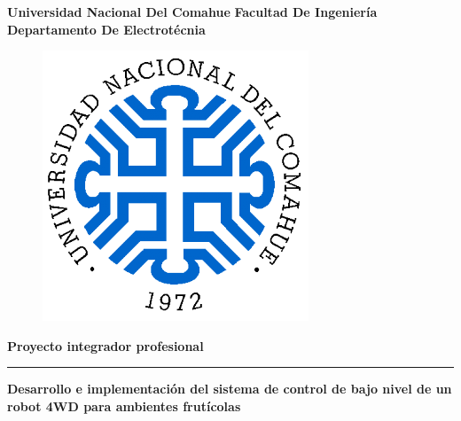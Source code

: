 \begin{titlepage}
    \begin{center}
        {\LARGE \textbf{Universidad Nacional Del Comahue}} 
        \vspace{4mm}
        {\LARGE \textbf{Facultad De Ingeniería}}
        {\LARGE \textbf{Departamento De Electrotécnia}}\\ %
        \vspace{5mm} %
        \begin{figure}[h]
            \centering
            \includegraphics[scale = 1.3]{img/LogoUNCO.png} %
        \end{figure}
        \vspace{1cm}
        {\large \textbf{Proyecto integrador profesional}}
        \rule{150mm}{0.1mm} %
        \vspace{5mm}

        {\LARGE \textbf{Desarrollo e implementación del sistema de control de bajo nivel de un robot 4WD para ambientes frutícolas}}

    \end{center}
\end{titlepage}